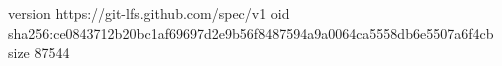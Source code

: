 version https://git-lfs.github.com/spec/v1
oid sha256:ce0843712b20bc1af69697d2e9b56f8487594a9a0064ca5558db6e5507a6f4cb
size 87544
